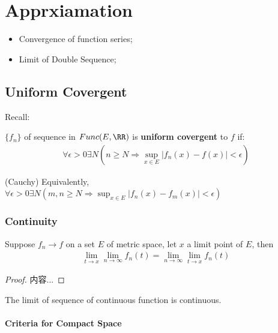 \documentclass[Total.tex]{subfiles}
\begin{document}
	
	\chapter{Apprxiamation}
	\begin{prob}
		\begin{itemize}
			\item 
			Convergence of function series;
			\item Limit of Double Sequence;
		\end{itemize}
	\end{prob}
	\section{Uniform Covergent}
		Recall:
		\begin{Def}
			$\{f_n\}$ of sequence in $Func(E,\RR)$ is \textbf{uniform covergent} to $f$ if:
			\begin{gather*}
				\forall \epsilon>0\exists N(n\geq N\Rightarrow \sup_{x\in E} |f_n(x)-f(x)|<\epsilon)
			\end{gather*}
		\end{Def}
		
		\begin{proposition}
			(Cauchy) Equivalently, $\forall \epsilon>0\exists N(m,n\geq N\Rightarrow \sup_{x\in E} |f_n(x)-f_m(x)|<\epsilon)$
		\end{proposition}
		\subsection{Continuity}
			
			\begin{theorem}
				Suppose $f_n\rightarrow f$ on a set $E$ of metric space, let $x$ a limit point of $E$, then
				\begin{gather*}
					\lim_{t\rightarrow x}\lim_{n\rightarrow \infty} f_n(t)=\lim_{n\rightarrow \infty}\lim_{t\rightarrow x} f_n(t)
				\end{gather*}
			\end{theorem}
			\begin{proof}
				内容...
			\end{proof}
			
			\begin{corollary}
				The limit of sequence of continuous function is continuous.
			\end{corollary}
			
			\subsubsection{Criteria for Compact Space}
			
\end{document}
